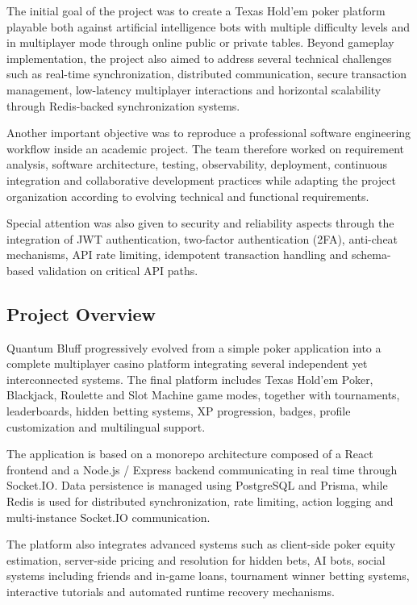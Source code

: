 \documentclass[11pt,a4paper]{article}
\begin{document}
The initial goal of the project was to create a Texas Hold'em poker platform playable both against artificial intelligence bots with multiple difficulty levels and in multiplayer mode through online public or private tables. Beyond gameplay implementation, the project also aimed to address several technical challenges such as real-time synchronization, distributed communication, secure transaction management, low-latency multiplayer interactions and horizontal scalability through Redis-backed synchronization systems.

Another important objective was to reproduce a professional software engineering workflow inside an academic project. The team therefore worked on requirement analysis, software architecture, testing, observability, deployment, continuous integration and collaborative development practices while adapting the project organization according to evolving technical and functional requirements.

Special attention was also given to security and reliability aspects through the integration of JWT authentication, two-factor authentication (2FA), anti-cheat mechanisms, API rate limiting, idempotent transaction handling and schema-based validation on critical API paths.

\subsection{Project Overview}

Quantum Bluff progressively evolved from a simple poker application into a complete multiplayer casino platform integrating several independent yet interconnected systems. The final platform includes Texas Hold'em Poker, Blackjack, Roulette and Slot Machine game modes, together with tournaments, leaderboards, hidden betting systems, XP progression, badges, profile customization and multilingual support.

The application is based on a monorepo architecture composed of a React frontend and a Node.js / Express backend communicating in real time through Socket.IO. Data persistence is managed using PostgreSQL and Prisma, while Redis is used for distributed synchronization, rate limiting, action logging and multi-instance Socket.IO communication.

The platform also integrates advanced systems such as client-side poker equity estimation, server-side pricing and resolution for hidden bets, AI bots, social systems including friends and in-game loans, tournament winner betting systems, interactive tutorials and automated runtime recovery mechanisms.
\end{document}
